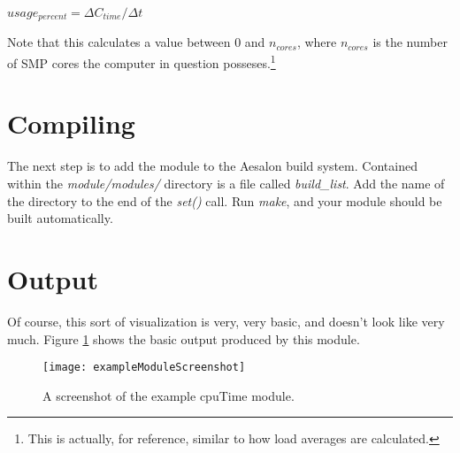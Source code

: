 \begin{center}
  \begin{math}
    usage_{percent} = \Delta C_{time} / \Delta t
  \end{math}
\end{center}

Note that this calculates a value between 0 and $n_{cores}$, where $n_{cores}$ is the number of SMP cores the computer
in question posseses.\footnote{This is actually, for reference, similar to how load averages are calculated.}

\section{Compiling}
The next step is to add the module to the Aesalon build system. Contained within the \emph{module/modules/} directory
is a file called \emph{build\_list}. Add the name of the directory to the end of the \emph{set()} call. Run \emph{make},
and your module should be built automatically.

\section{Output}
Of course, this sort of visualization is very, very basic, and doesn't look like very much.
Figure \ref{exampleModuleOutput} shows the basic output produced by this module.

\begin{figure}[t]
  \begin{center}
    \texttt{[image: exampleModuleScreenshot]}
  \end{center}
  \caption{A screenshot of the example cpuTime module. \label{exampleModuleOutput}}
\end{figure}
